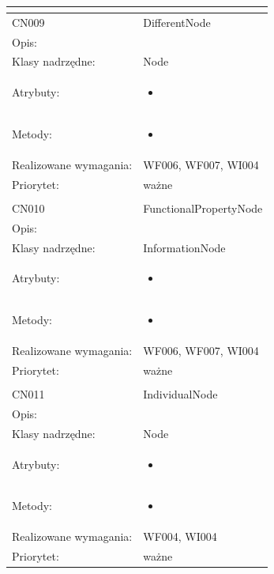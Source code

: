 \documentclass[a4paper,10pt]{article}
\begin{document}
\begin{center}
\begin{longtable}{|m{3cm}|m{9cm}|}
\multicolumn{2}{c}{} \\
 \hline

CN009 & DifferentNode \\ \hline
Opis: &     \\ \hline
Klasy nadrzędne: & Node     \\ \hline
Atrybuty: & \begin{itemize}
 \item 
\end{itemize}
 \\ \hline
Metody: & \begin{itemize}
 \item 
\end{itemize}
  \\ \hline
Realizowane wymagania: & WF006, WF007, WI004 \\ \hline
Priorytet: & ważne  \\ \hline

\multicolumn{2}{c}{} \\
 \hline

CN010 & FunctionalPropertyNode \\ \hline
Opis: &     \\ \hline
Klasy nadrzędne: & InformationNode     \\ \hline
Atrybuty: & \begin{itemize}
 \item 
\end{itemize}
 \\ \hline
Metody: & \begin{itemize}
 \item 
\end{itemize}
  \\ \hline
Realizowane wymagania: & WF006, WF007, WI004 \\ \hline
Priorytet: & ważne  \\ \hline

\multicolumn{2}{c}{} \\
 \hline

CN011 & IndividualNode \\ \hline
Opis: &     \\ \hline
Klasy nadrzędne: & Node     \\ \hline
Atrybuty: & \begin{itemize}
 \item 
\end{itemize}
 \\ \hline
Metody: & \begin{itemize}
 \item 
\end{itemize}
  \\ \hline
Realizowane wymagania: & WF004, WI004 \\ \hline
Priorytet: & ważne  \\ \hline


\end{longtable}
\end{center}
\end{document}

